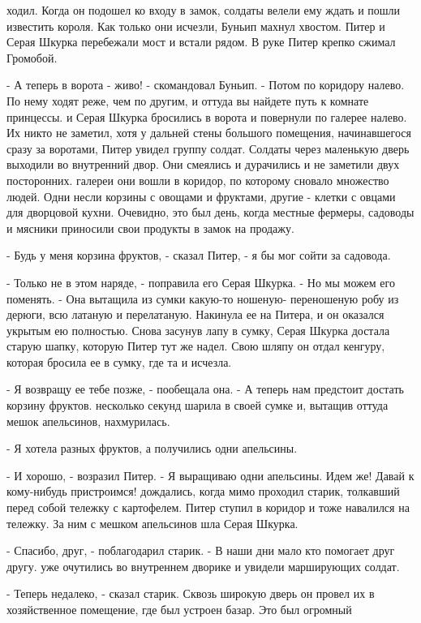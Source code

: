 ходил. Когда он подошел ко входу в замок, солдаты велели ему ждать и 
пошли известить короля. Как только они исчезли, Буньип махнул хвостом. 
Питер и Серая Шкурка перебежали мост и встали рядом. В руке Питер 
крепко сжимал Громобой.
\par- А теперь в ворота - живо! - скомандовал Буньип. - Потом по 
коридору налево. По нему ходят реже, чем по другим, и оттуда вы 
найдете путь к комнате принцессы.
 и Серая Шкурка бросились в ворота и повернули по галерее 
налево. Их никто не заметил, хотя у дальней стены большого помещения, 
начинавшегося сразу за воротами, Питер увидел группу солдат. Солдаты 
через маленькую дверь выходили во внутренний двор. Они смеялись и 
дурачились и не заметили двух посторонних.
 галереи они вошли в коридор, по которому сновало множество 
людей. Одни несли корзины с овощами и фруктами, другие - клетки с 
овцами для дворцовой кухни. Очевидно, это был день, когда местные 
фермеры, садоводы и мясники приносили свои продукты в замок на 
продажу.
\par- Будь у меня корзина фруктов, - сказал Питер, - я бы мог сойти за 
садовода.
\par- Только не в этом наряде, - поправила его Серая Шкурка. - Но мы 
можем его поменять. - Она вытащила из сумки какую-то ношеную-
переношеную робу из дерюги, всю латаную и перелатаную. Накинула ее на 
Питера, и он оказался укрытым ею полностью. Снова засунув лапу в 
сумку, Серая Шкурка достала старую шапку, которую Питер тут же надел. 
Свою шляпу он отдал кенгуру, которая бросила ее в сумку, где та и 
исчезла.
\par- Я возвращу ее тебе позже, - пообещала она. - А теперь нам 
предстоит достать корзину фруктов.
 несколько секунд шарила в своей сумке и, вытащив оттуда мешок 
апельсинов, нахмурилась.
\par- Я хотела разных фруктов, а получились одни апельсины.
\par- И хорошо, - возразил Питер. - Я выращиваю одни апельсины. Идем 
же! Давай к кому-нибудь пристроимся!
 дождались, когда мимо проходил старик, толкавший перед собой 
тележку с картофелем. Питер ступил в коридор и тоже навалился на 
тележку. За ним с мешком апельсинов шла Серая Шкурка.
\par- Спасибо, друг, - поблагодарил старик. - В наши дни мало кто 
помогает друг другу.
 уже очутились во внутреннем дворике и увидели марширующих 
солдат.
\par- Теперь недалеко, - сказал старик. Сквозь широкую дверь он провел 
их в хозяйственное помещение, где был устроен базар. Это был огромный 

